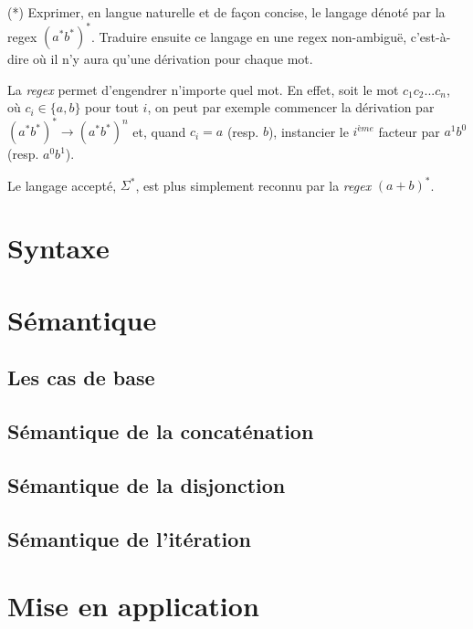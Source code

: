 \begin{exercice} (*)
Exprimer, en langue naturelle et de façon concise, le langage dénoté par la regex $(a^*b^*)^*$. Traduire ensuite ce langage en une regex non-ambiguë, c'est-à-dire où il n'y aura qu'une dérivation pour chaque mot.
\end{exercice}

\begin{correction*}
La \textit{regex} permet d'engendrer n'importe quel mot. En effet, soit le mot $c_1c_2...c_n$, où $c_i \in \{a,b\}$ pour tout $i$, on peut par exemple commencer la dérivation par $(a^*b^*)^* \rightarrow (a^*b^*)^n$ et, quand $c_i = a$ (resp. $b$), instancier le $i^{ème}$ facteur par $a^1b^0$ (resp. $a^0b^1$).

Le langage accepté, $\Sigma^*$, est plus simplement reconnu par la \textit{regex} $(a+b)^*$.
\end{correction*}

\section{Syntaxe}


\section{Sémantique}
\label{resem}

\subsection{Les cas de base}

\subsection{Sémantique de la concaténation}

\subsection{Sémantique de la disjonction}

\subsection{Sémantique de l'itération}


\section{Mise en application}

